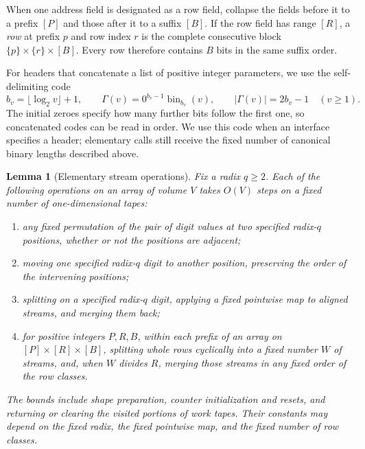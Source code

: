 \documentclass[11pt]{article}
\newtheorem{lemma}[theorem]{Lemma}
\theoremstyle{definition}
\begin{document}
When one address field is designated as a row field, collapse the fields
before it to a prefix $[P]$ and those after it to a suffix $[B]$.  If the
row field has range $[R]$, a \emph{row} at prefix $p$ and row index $r$
is the complete consecutive block $\{p\}\times\{r\}\times[B]$.
Every row therefore contains $B$ bits in the same suffix order.

For headers that concatenate a list of positive integer parameters, we use
the self-delimiting code
\begin{equation}
 b_v=\lfloor\log_2v\rfloor+1,\qquad
 \Gamma(v)=0^{b_v-1}\operatorname{bin}_{b_v}(v),\qquad
 |\Gamma(v)|=2b_v-1\quad(v\ge1).
 \label{eq:integer-descriptor-code}
\end{equation}
The initial zeroes specify how many further bits follow the first one,
so concatenated codes can be read in order. We use this code when an
interface specifies a header; elementary calls still receive the fixed
number of canonical binary lengths described above.

\begin{lemma}[Elementary stream operations]
\label{lem:elementary-streams}
Fix a radix $q\ge2$.  Each of the following operations on an array of
volume $V$ takes $O(V)$ steps on a fixed number of one-dimensional tapes:
\begin{enumerate}
\item any fixed permutation of the pair of digit values at two specified
radix-$q$ positions, whether or not the positions are adjacent;
\item moving one specified radix-$q$ digit to another position, preserving
the order of the intervening positions;
\item splitting on a specified radix-$q$ digit, applying a fixed
pointwise map to aligned streams, and merging them back;
\item for positive integers $P,R,B$, within each prefix of an array on
$[P]\times[R]\times[B]$, splitting
whole rows cyclically into a fixed number $W$ of streams, and, when $W$
divides $R$, merging those streams in any fixed order of the row classes.
\end{enumerate}
The bounds include shape preparation, counter initialization and resets,
and returning or clearing the visited portions of work tapes.  Their
constants may depend on the fixed radix, the fixed pointwise map, and the
fixed number of row classes.
\end{lemma}
\end{document}
